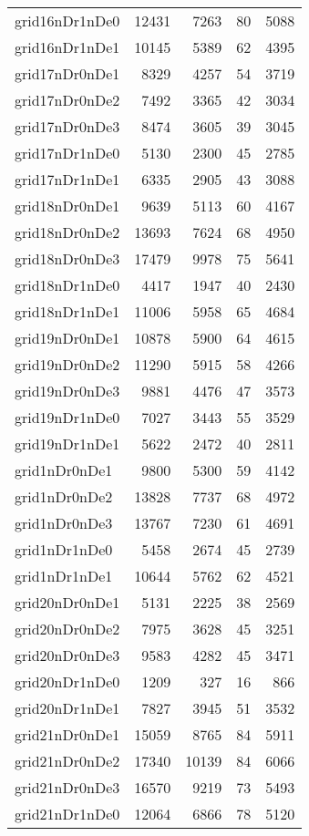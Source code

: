 \begin{longtable}{lrrrr}
grid16nDr1nDe0 & 12431 & 7263 & 80 & 5088 \\
grid16nDr1nDe1 & 10145 & 5389 & 62 & 4395 \\
grid17nDr0nDe1 & 8329 & 4257 & 54 & 3719 \\
grid17nDr0nDe2 & 7492 & 3365 & 42 & 3034 \\
grid17nDr0nDe3 & 8474 & 3605 & 39 & 3045 \\
grid17nDr1nDe0 & 5130 & 2300 & 45 & 2785 \\
grid17nDr1nDe1 & 6335 & 2905 & 43 & 3088 \\
grid18nDr0nDe1 & 9639 & 5113 & 60 & 4167 \\
grid18nDr0nDe2 & 13693 & 7624 & 68 & 4950 \\
grid18nDr0nDe3 & 17479 & 9978 & 75 & 5641 \\
grid18nDr1nDe0 & 4417 & 1947 & 40 & 2430 \\
grid18nDr1nDe1 & 11006 & 5958 & 65 & 4684 \\
grid19nDr0nDe1 & 10878 & 5900 & 64 & 4615 \\
grid19nDr0nDe2 & 11290 & 5915 & 58 & 4266 \\
grid19nDr0nDe3 & 9881 & 4476 & 47 & 3573 \\
grid19nDr1nDe0 & 7027 & 3443 & 55 & 3529 \\
grid19nDr1nDe1 & 5622 & 2472 & 40 & 2811 \\
grid1nDr0nDe1 & 9800 & 5300 & 59 & 4142 \\
grid1nDr0nDe2 & 13828 & 7737 & 68 & 4972 \\
grid1nDr0nDe3 & 13767 & 7230 & 61 & 4691 \\
grid1nDr1nDe0 & 5458 & 2674 & 45 & 2739 \\
grid1nDr1nDe1 & 10644 & 5762 & 62 & 4521 \\
grid20nDr0nDe1 & 5131 & 2225 & 38 & 2569 \\
grid20nDr0nDe2 & 7975 & 3628 & 45 & 3251 \\
grid20nDr0nDe3 & 9583 & 4282 & 45 & 3471 \\
grid20nDr1nDe0 & 1209 & 327 & 16 & 866 \\
grid20nDr1nDe1 & 7827 & 3945 & 51 & 3532 \\
grid21nDr0nDe1 & 15059 & 8765 & 84 & 5911 \\
grid21nDr0nDe2 & 17340 & 10139 & 84 & 6066 \\
grid21nDr0nDe3 & 16570 & 9219 & 73 & 5493 \\
grid21nDr1nDe0 & 12064 & 6866 & 78 & 5120 \\

\end{longtable}
